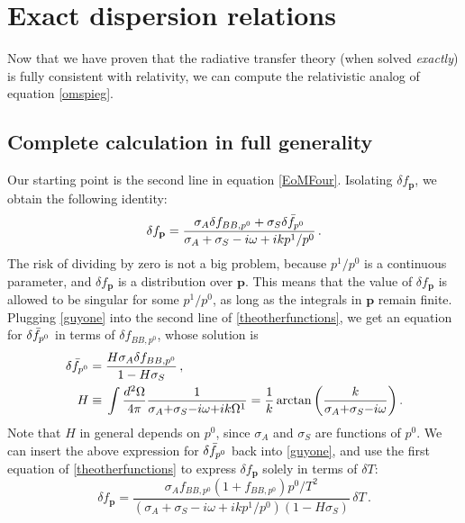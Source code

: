 \documentclass[a4paper, amsfonts, amssymb, amsmath, reprint, showkeys, nofootinbib, twoside,notitlepage,onecolumn]{revtex4-2}
\theoremstyle{definition}
\theoremstyle{theorem}
\theoremstyle{corollary}
\begin{document}
\section{Exact dispersion relations}

Now that we have proven that the radiative transfer theory (when solved \textit{exactly}) is fully consistent with relativity, we can compute the relativistic analog of equation \eqref{omspieg}.

\subsection{Complete calculation in full generality}

Our starting point is the second line in equation \eqref{EoMFour}. Isolating $\delta f_\mathbf{p}$, we obtain the following identity:
\begin{equation}\label{guyone}
\delta f_\mathbf{p} =\dfrac{\sigma_A \delta f_{BB,p^0}+\sigma_S \delta \Bar{f}_{p^0}}{\sigma_A +\sigma_S -i\omega +ikp^1/p^0} \, .
\end{equation}
The risk of dividing by zero is not a big problem, because $p^1/p^0$ is a continuous parameter, and $\delta f_\mathbf{p}$ is a distribution over $\mathbf{p}$. This means that the value of $\delta f_\mathbf{p}$ is allowed to be singular for some $p^1/p^0$, as long as the integrals in $\mathbf{p}$ remain finite. 
Plugging \eqref{guyone} into the second line of \eqref{theotherfunctions}, we get an equation for $\delta \Bar{f}_{p^0}$ in terms of $\delta f_{BB,p^0}$, whose solution is
\begin{equation}
\begin{split}
\delta \Bar{f}_{p^0}={}& \dfrac{H \sigma_A \delta f_{BB,p^0}}{1-H\sigma_S} \, , \\
H \equiv {}& \int \dfrac{d^2 \Omega}{4\pi} \dfrac{1}{\sigma_A {+}\sigma_S {-}i\omega {+}ik\Omega^1}= \dfrac{1}{k} \arctan\bigg(\dfrac{k}{\sigma_A {+}\sigma_S {-}i\omega} \bigg) \, . \\
\end{split}
\end{equation}
Note that $H$ in general depends on $p^0$, since $\sigma_A$ and $\sigma_S$ are functions of $p^0$.
We can insert the above expression for $\delta \Bar{f}_{p^0}$ back into \eqref{guyone}, and use the first equation of \eqref{theotherfunctions} to express $\delta f_\mathbf{p}$ solely in terms of $\delta T$:
\begin{equation}
\delta f_\mathbf{p} =\dfrac{\sigma_A f_{BB,p^0}(1{+}f_{BB,p^0}) p^0/T^2}{(\sigma_A +\sigma_S -i\omega +ikp^1/p^0)(1-H\sigma_S)} \, \delta T \, .
\end{equation}
\end{document}
